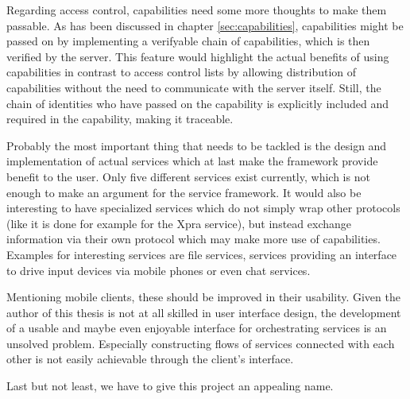 Regarding access control, capabilities need some more thoughts to make them passable.
As has been discussed in chapter \ref{sec:capabilities}, capabilities might be passed on by implementing a verifyable chain of capabilities, which is then verified by the server.
This feature would highlight the actual benefits of using capabilities in contrast to access control lists by allowing distribution of capabilities without the need to communicate with the server itself.
Still, the chain of identities who have passed on the capability is explicitly included and required in the capability, making it traceable.

Probably the most important thing that needs to be tackled is the design and implementation of actual services which at last make the framework provide benefit to the user.
Only five different services exist currently, which  is not enough to make an argument for the service framework.
It would also be interesting to have specialized services which do not simply wrap other protocols (like it is done for example for the Xpra service), but instead exchange information via their own protocol which may make more use of capabilities.
Examples for interesting services are file services, services providing an interface to drive input devices via mobile phones or even chat services.

Mentioning mobile clients, these should be improved in their usability.
Given the author of this thesis is not at all skilled in user interface design, the development of a usable and maybe even enjoyable interface for orchestrating services is an unsolved problem.
Especially constructing flows of services connected with each other is not easily achievable through the client's interface.

Last but not least, we have to give this project an appealing name.

